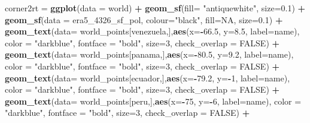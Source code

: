 \documentclass[12pt,twoside]{reedthesis}
\newenvironment{Shaded}{\begin{snugshade}}{\end{snugshade}}
\newcommand{\DataTypeTok}[1]{\textcolor[rgb]{0.13,0.29,0.53}{#1}}
\newcommand{\DecValTok}[1]{\textcolor[rgb]{0.00,0.00,0.81}{#1}}
\newcommand{\FloatTok}[1]{\textcolor[rgb]{0.00,0.00,0.81}{#1}}
\newcommand{\KeywordTok}[1]{\textcolor[rgb]{0.13,0.29,0.53}{\textbf{#1}}}
\newcommand{\NormalTok}[1]{#1}
\newcommand{\OperatorTok}[1]{\textcolor[rgb]{0.81,0.36,0.00}{\textbf{#1}}}
\newcommand{\OtherTok}[1]{\textcolor[rgb]{0.56,0.35,0.01}{#1}}
\newcommand{\StringTok}[1]{\textcolor[rgb]{0.31,0.60,0.02}{#1}}
\begin{document}
\begin{Shaded}
\begin{Highlighting}[]
\NormalTok{corner2rt =}\StringTok{ }\KeywordTok{ggplot}\NormalTok{(}\DataTypeTok{data =}\NormalTok{ world) }\OperatorTok{+}\StringTok{ }
\StringTok{  }\KeywordTok{geom_sf}\NormalTok{(}\DataTypeTok{fill=} \StringTok{"antiquewhite"}\NormalTok{,  }\DataTypeTok{size=}\FloatTok{0.1}\NormalTok{) }\OperatorTok{+}\StringTok{ }
\StringTok{  }\KeywordTok{geom_sf}\NormalTok{(}\DataTypeTok{data =}\NormalTok{ era5_}\DecValTok{4326}\NormalTok{_sf_pol, }\DataTypeTok{colour=}\StringTok{"black"}\NormalTok{, }\DataTypeTok{fill=}\OtherTok{NA}\NormalTok{, }\DataTypeTok{size=}\FloatTok{0.1}\NormalTok{) }\OperatorTok{+}\StringTok{ }
\StringTok{  }\KeywordTok{geom_text}\NormalTok{(}\DataTypeTok{data=}\NormalTok{ world_points[venezuela,],}\KeywordTok{aes}\NormalTok{(}\DataTypeTok{x=}\OperatorTok{-}\FloatTok{66.5}\NormalTok{, }\DataTypeTok{y=}\FloatTok{8.5}\NormalTok{, }\DataTypeTok{label=}\NormalTok{name), }\DataTypeTok{color =} \StringTok{"darkblue"}\NormalTok{, }\DataTypeTok{fontface =} \StringTok{"bold"}\NormalTok{, }\DataTypeTok{size=}\DecValTok{3}\NormalTok{, }\DataTypeTok{check_overlap =} \OtherTok{FALSE}\NormalTok{) }\OperatorTok{+}
\StringTok{  }\KeywordTok{geom_text}\NormalTok{(}\DataTypeTok{data=}\NormalTok{ world_points[panama,],}\KeywordTok{aes}\NormalTok{(}\DataTypeTok{x=}\OperatorTok{-}\FloatTok{80.5}\NormalTok{, }\DataTypeTok{y=}\FloatTok{9.2}\NormalTok{, }\DataTypeTok{label=}\NormalTok{name), }\DataTypeTok{color =} \StringTok{"darkblue"}\NormalTok{, }\DataTypeTok{fontface =} \StringTok{"bold"}\NormalTok{, }\DataTypeTok{size=}\DecValTok{3}\NormalTok{, }\DataTypeTok{check_overlap =} \OtherTok{FALSE}\NormalTok{) }\OperatorTok{+}\StringTok{ }
\StringTok{  }\KeywordTok{geom_text}\NormalTok{(}\DataTypeTok{data=}\NormalTok{ world_points[ecuador,],}\KeywordTok{aes}\NormalTok{(}\DataTypeTok{x=}\OperatorTok{-}\FloatTok{79.2}\NormalTok{, }\DataTypeTok{y=}\OperatorTok{-}\DecValTok{1}\NormalTok{, }\DataTypeTok{label=}\NormalTok{name), }\DataTypeTok{color =} \StringTok{"darkblue"}\NormalTok{, }\DataTypeTok{fontface =} \StringTok{"bold"}\NormalTok{, }\DataTypeTok{size=}\DecValTok{3}\NormalTok{, }\DataTypeTok{check_overlap =} \OtherTok{FALSE}\NormalTok{) }\OperatorTok{+}
\StringTok{  }\KeywordTok{geom_text}\NormalTok{(}\DataTypeTok{data=}\NormalTok{ world_points[peru,],}\KeywordTok{aes}\NormalTok{(}\DataTypeTok{x=}\OperatorTok{-}\DecValTok{75}\NormalTok{, }\DataTypeTok{y=}\OperatorTok{-}\DecValTok{6}\NormalTok{, }\DataTypeTok{label=}\NormalTok{name), }\DataTypeTok{color =} \StringTok{"darkblue"}\NormalTok{, }\DataTypeTok{fontface =} \StringTok{"bold"}\NormalTok{, }\DataTypeTok{size=}\DecValTok{3}\NormalTok{, }\DataTypeTok{check_overlap =} \OtherTok{FALSE}\NormalTok{) }\OperatorTok{+}

\end{Highlighting}
\end{Shaded}
\end{document}
